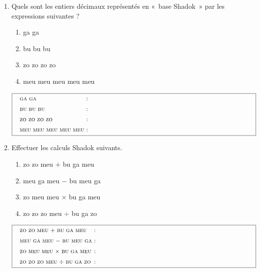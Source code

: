 \documentclass[11pt,a4paper]{article}
\begin{document}
\noindent\begin{enumerate}
\item Quels sont les entiers décimaux représentés en «~base Shadok~» 
	par les expressions suivantes ?
	\begin{enumerate}
	\item {\sc ga} {\sc ga}
	\item {\sc bu} {\sc bu} {\sc bu}
	\item {\sc zo} {\sc zo} {\sc zo} {\sc zo}
	\item {\sc meu} {\sc meu} {\sc meu} {\sc meu} {\sc meu} 
	\end{enumerate}	
	$$\framebox[14.5cm]{\begin{minipage}{14cm}
	\begin{tabular}{l@{ : }l}
	{\sc ga} {\sc ga} & \\[2mm]
	{\sc bu} {\sc bu} {\sc bu} & \\[2mm]
	{\sc zo} {\sc zo} {\sc zo} {\sc zo} & \\[2mm]
	{\sc meu} {\sc meu} {\sc meu} {\sc meu} {\sc meu} &
	\end{tabular}
	\end{minipage}}$$
\newpage
\item Effectuer les calculs Shadok suivants.
	\begin{enumerate}
	\item {\sc zo} {\sc zo} {\sc meu} $+$ {\sc bu} {\sc ga} {\sc meu}
	\item {\sc meu} {\sc ga} {\sc meu} $-$ {\sc bu} {\sc meu} {\sc ga}
	\item {\sc zo} {\sc meu} {\sc meu} $\times$ {\sc bu} {\sc ga} {\sc meu}
	\item {\sc zo} {\sc zo} {\sc zo} {\sc meu} $\div$ {\sc bu} {\sc ga} {\sc zo}
	\end{enumerate}
	$$\framebox[14.5cm]{\begin{minipage}{14cm}
	\begin{tabular}{l@{ : }l}
	{\sc zo} {\sc zo} {\sc meu} $+$ {\sc bu} {\sc ga} {\sc meu} & \\[2mm]
	{\sc meu} {\sc ga} {\sc meu} $-$ {\sc bu} {\sc meu} {\sc ga} & \\[2mm]
	{\sc zo} {\sc meu} {\sc meu} $\times$ {\sc bu} {\sc ga} {\sc meu} & \\[2mm]
	{\sc zo} {\sc zo} {\sc zo} {\sc meu} $\div$ {\sc bu} {\sc ga} {\sc zo}
	\end{tabular}
	\end{minipage}}$$
\end{enumerate}

\label{fini}
\end{document}
